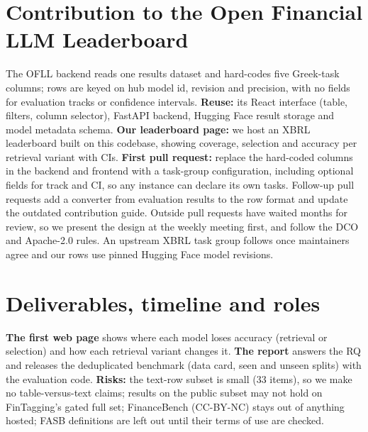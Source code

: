 \documentclass[10pt]{article}
\begin{document}
\section{Contribution to the Open Financial LLM Leaderboard}
The OFLL backend reads one results dataset and hard-codes five Greek-task columns; rows are keyed on hub model id,
revision and precision, with no fields for evaluation tracks or confidence intervals. \textbf{Reuse:} its React interface
(table, filters, column selector), FastAPI backend, Hugging Face result storage and model metadata schema.
\textbf{Our leaderboard page:} we host an XBRL leaderboard built on this codebase, showing coverage, selection and
accuracy per retrieval variant with CIs. \textbf{First pull request:} replace the hard-coded columns in the backend and
frontend with a task-group configuration, including optional fields for track and CI, so any instance can declare its
own tasks. Follow-up pull requests add a converter from evaluation results to the row format and update the outdated
contribution guide. Outside pull requests have waited months for review, so we present the design at the weekly
meeting first, and follow the DCO and Apache-2.0 rules.
An upstream XBRL task group follows once maintainers agree and our rows use pinned Hugging Face model revisions.

\section{Deliverables, timeline and roles}
\textbf{The first web page} shows where each model loses accuracy (retrieval or selection) and how each retrieval
variant changes it. \textbf{The report} answers the RQ and releases the deduplicated benchmark (data card, seen and
unseen splits) with the evaluation code. \textbf{Risks:} the text-row subset is small (33 items), so we make no
table-versus-text claims; results on the public subset may not hold on FinTagging's gated full set; FinanceBench
(CC-BY-NC) stays out of anything hosted; FASB definitions are left out until their terms of use are checked.
\end{document}
